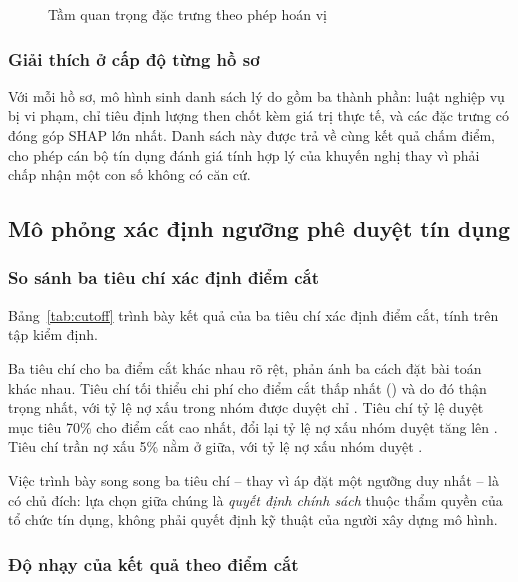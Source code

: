 \begin{figure}[!htbp]
\centering
{}
\caption{Tầm quan trọng đặc trưng theo phép hoán vị}
\label{fig:permutation}
\end{figure}

\subsubsection{Giải thích ở cấp độ từng hồ sơ}

Với mỗi hồ sơ, mô hình sinh danh sách lý do gồm ba thành phần: luật nghiệp vụ bị
vi phạm, chỉ tiêu định lượng then chốt kèm giá trị thực tế, và các đặc trưng có
đóng góp SHAP lớn nhất. Danh sách này được trả về cùng kết quả chấm điểm, cho
phép cán bộ tín dụng đánh giá tính hợp lý của khuyến nghị thay vì phải chấp nhận
một con số không có căn cứ.

\subsection{Mô phỏng xác định ngưỡng phê duyệt tín dụng}
\label{subsec:kq-nguong}

\subsubsection{So sánh ba tiêu chí xác định điểm cắt}

Bảng~\ref{tab:cutoff} trình bày kết quả của ba tiêu chí xác định điểm cắt, tính
trên tập kiểm định.



Ba tiêu chí cho ba điểm cắt khác nhau rõ rệt, phản ánh ba cách đặt bài toán khác
nhau. Tiêu chí tối thiểu chi phí cho điểm cắt thấp nhất (\CostOptimalCut{}) và do
đó thận trọng nhất, với tỷ lệ nợ xấu trong nhóm được duyệt chỉ
\CutoffCostBadRate{}. Tiêu chí tỷ lệ duyệt mục tiêu 70\% cho điểm cắt cao nhất,
đổi lại tỷ lệ nợ xấu nhóm duyệt tăng lên \CutoffRateBadRate{}. Tiêu chí trần nợ
xấu 5\% nằm ở giữa, với tỷ lệ nợ xấu nhóm duyệt \CutoffCapBadRate{}.

Việc trình bày song song ba tiêu chí -- thay vì áp đặt một ngưỡng duy nhất -- là
có chủ đích: lựa chọn giữa chúng là \textit{quyết định chính sách} thuộc thẩm
quyền của tổ chức tín dụng, không phải quyết định kỹ thuật của người xây dựng mô
hình.

\subsubsection{Độ nhạy của kết quả theo điểm cắt}

